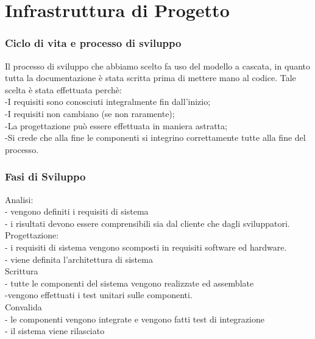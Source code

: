 \documentclass[a4paper,12pt]{beamer}
\begin{document}
\pagebreak

\section{Infrastruttura di Progetto}
\begin{frame}
\frametitle{Ciclo di vita e processo di sviluppo}
Il processo di sviluppo che abbiamo scelto fa uso del modello a cascata, in quanto tutta la documentazione è stata scritta prima di mettere mano al codice. Tale scelta è stata effettuata perchè:\\
-I requisiti sono conosciuti integralmente fin dall’inizio;\\
-I requisiti non cambiano (se non raramente);\\
-La progettazione può essere effettuata in maniera astratta;\\
-Si crede che alla fine le componenti si integrino correttamente tutte alla fine del processo.\\
\end{frame}

\begin{frame}
\frametitle{Fasi di Sviluppo}
Analisi:\\
- vengono definiti i requisiti di sistema\\
- i risultati devono essere comprensibili sia dal cliente che dagli sviluppatori.\\
Progettazione:\\
- i requisiti di sistema vengono scomposti in requisiti software ed hardware.\\
- viene definita l’architettura di sistema\\
Scrittura \\
- tutte le componenti del sistema vengono realizzate ed assemblate  \\
-vengono effettuati i test unitari sulle componenti.\\
Convalida\\
- le componenti vengono integrate e vengono fatti test di integrazione\\
- il sistema viene rilasciato\\
\end{frame}

\pagebreak
\end{document}
